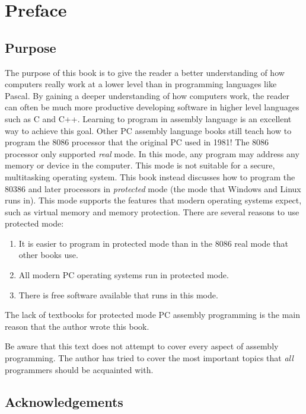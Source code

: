 
\chapter{Preface}

\section*{Purpose}

The purpose of this book is to give the reader a better understanding
of how computers really work at a lower level than in programming
languages like Pascal. By gaining a deeper understanding of how
computers work, the reader can often be much more productive
developing software in higher level languages such as C and
C++. Learning to program in assembly language is an excellent way to
achieve this goal. Other PC assembly language books still teach how to
program the 8086 processor that the original PC used in 1981!  The
8086 processor only supported \emph{real} mode. In this mode, any
program may address any memory or device in the computer. This mode is
not suitable for a secure, multitasking operating system.  This book
instead discusses how to program the 80386 and later processors in
\emph{protected} mode (the mode that Windows and Linux runs in).
This mode supports the features that modern operating systems expect,
such as virtual memory and memory protection.
There are several reasons to use protected mode:
\begin{enumerate}
\item It is easier to program in protected mode than in the 8086 real mode
      that other books use.
\item All modern PC operating systems run in protected mode.
\item There is free software available that runs in this mode.
\end{enumerate}
The lack of textbooks for protected mode PC assembly programming is the
main reason that the author wrote this book.

Be aware that this text does not attempt to cover every aspect of assembly
programming. The author has tried to cover the most important topics that
\emph{all} programmers should be acquainted with.

\section*{Acknowledgements}

